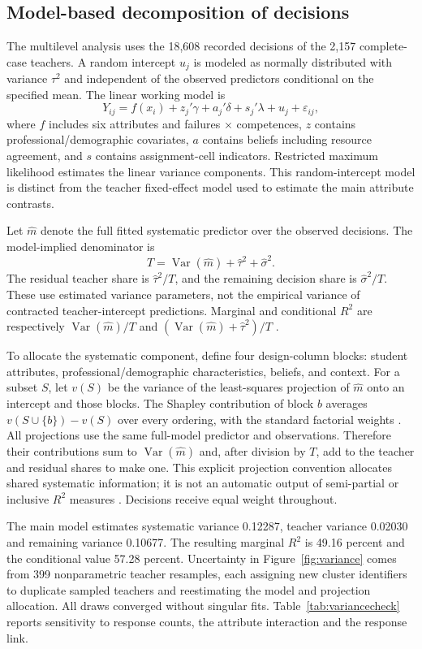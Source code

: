 \subsection{Model-based decomposition of decisions}
\begin{addition}
The multilevel analysis uses the 18,608 recorded decisions of the 2,157 complete-case teachers. A random intercept $u_j$ is modeled as normally distributed with variance $\tau^2$ and independent of the observed predictors conditional on the specified mean. The linear working model is
\[
Y_{ij}=f(x_i)+z_j'\gamma+a_j'\delta+s_j'\lambda+u_j+\varepsilon_{ij},
\]
where $f$ includes six attributes and failures $\times$ competences, $z$ contains professional/demographic covariates, $a$ contains beliefs including resource agreement, and $s$ contains assignment-cell indicators. Restricted maximum likelihood estimates the linear variance components. This random-intercept model is distinct from the teacher fixed-effect model used to estimate the main attribute contrasts.

Let $\widehat m$ denote the full fitted systematic predictor over the observed decisions. The model-implied denominator is
\[
T=\operatorname{Var}(\widehat m)+\widehat\tau^2+\widehat\sigma^2.
\]
The residual teacher share is $\widehat\tau^2/T$, and the remaining decision share is $\widehat\sigma^2/T$. These use estimated variance parameters, not the empirical variance of contracted teacher-intercept predictions. Marginal and conditional $R^2$ are respectively $\operatorname{Var}(\widehat m)/T$ and $(\operatorname{Var}(\widehat m)+\widehat\tau^2)/T$ \cite{nakagawa}.

To allocate the systematic component, define four design-column blocks: student attributes, professional/demographic characteristics, beliefs, and context. For a subset $S$, let $v(S)$ be the variance of the least-squares projection of $\widehat m$ onto an intercept and those blocks. The Shapley contribution of block $b$ averages $v(S\cup\{b\})-v(S)$ over every ordering, with the standard factorial weights \cite{groemping}. All projections use the same full-model predictor and observations. Therefore their contributions sum to $\operatorname{Var}(\widehat m)$ and, after division by $T$, add to the teacher and residual shares to make one. This explicit projection convention allocates shared systematic information; it is not an automatic output of semi-partial or inclusive $R^2$ measures \cite{stoffel}. Decisions receive equal weight throughout.

The main model estimates systematic variance 0.12287, teacher variance 0.02030 and remaining variance 0.10677. The resulting marginal $R^2$ is 49.16 percent and the conditional value 57.28 percent. Uncertainty in Figure~\ref{fig:variance} comes from 399 nonparametric teacher resamples, each assigning new cluster identifiers to duplicate sampled teachers and reestimating the model and projection allocation. All draws converged without singular fits. Table~\ref{tab:variancecheck} reports sensitivity to response counts, the attribute interaction and the response link.
\end{addition}
